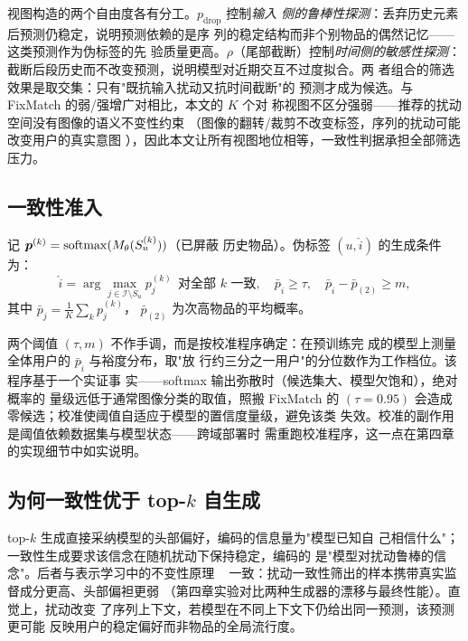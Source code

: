 视图构造的两个自由度各有分工。$p_{\mathrm{drop}}$ 控制\emph{输入
侧的鲁棒性探测}：丢弃历史元素后预测仍稳定，说明预测依赖的是序
列的稳定结构而非个别物品的偶然记忆——这类预测作为伪标签的先
验质量更高。$\rho$（尾部截断）控制\emph{时间侧的敏感性探测}：
截断后段历史而不改变预测，说明模型对近期交互不过度拟合。两
者组合的筛选效果是取交集：只有"既抗输入扰动又抗时间截断"的
预测才成为候选。与 FixMatch 的弱/强增广对相比，本文的 $K$ 个对
称视图不区分强弱——推荐的扰动空间没有图像的语义不变性约束
（图像的翻转/裁剪不改变标签，序列的扰动可能改变用户的真实意图
），因此本文让所有视图地位相等，一致性判据承担全部筛选压力。

\subsection{一致性准入}
记 $\bm{p}^{(k)} = \mathrm{softmax}(M_{\theta}(S_u^{(k)}))$（已屏蔽
历史物品）。伪标签 $(u, \hat{i})$ 的生成条件为：
\begin{equation}\label{eq:consistency}
\hat{i} = \arg\max_{j \in \mathcal{I} \setminus S_u}
p_j^{(k)}\ \ \text{对全部 } k \text{ 一致},\quad
\bar{p}_{\hat{i}} \geq \tau,\quad
\bar{p}_{\hat{i}} - \bar{p}_{(2)} \geq m,
\end{equation}
其中 $\bar{p}_{j} = \frac{1}{K}\sum_k p^{(k)}_j$，
$\bar{p}_{(2)}$ 为次高物品的平均概率。

两个阈值 $(\tau, m)$ 不作手调，而是按校准程序确定：在预训练完
成的模型上测量全体用户的 $\bar{p}_{\hat{i}}$ 与裕度分布，取"放
行约三分之一用户"的分位数作为工作档位。该程序基于一个实证事
实——softmax 输出弥散时（候选集大、模型欠饱和），绝对概率的
量级远低于通常图像分类的取值，照搬 FixMatch 的 $(\tau{=}0.95)$
会造成零候选；校准使阈值自适应于模型的置信度量级，避免该类
失效。校准的副作用是阈值依赖数据集与模型状态——跨域部署时
需重跑校准程序，这一点在第四章的实现细节中如实说明。

\subsection{为何一致性优于 top-$k$ 自生成}
top-$k$ 生成直接采纳模型的头部偏好，编码的信息量为"模型已知自
己相信什么"；一致性生成要求该信念在随机扰动下保持稳定，编码的
是"模型对扰动鲁棒的信念"。后者与表示学习中的不变性原理
~\cite{tarvainen2017mean,sohn2020fixmatch,berthelot2019mixmatch}
一致：扰动一致性筛出的样本携带真实监督成分更高、头部偏袒更弱
（第四章实验对比两种生成器的漂移与最终性能）。直觉上，扰动改变
了序列上下文，若模型在不同上下文下仍给出同一预测，该预测更可能
反映用户的稳定偏好而非物品的全局流行度。

